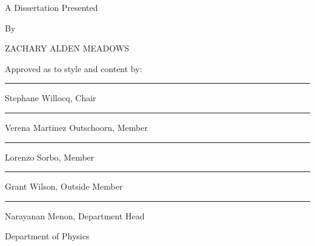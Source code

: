 \thispagestyle{empty}

\begin{center}
    \large
    \textbf{\expandafter{\ThesisTitle}} \par
    \vfill
    A Dissertation Presented \par
    By \par
    \uppercase\expandafter{Zachary Alden Meadows} \par
\end{center}

\vfill

\begin{flushleft}
    \normalsize
        Approved as to style and content by: \par
        \vskip 0.4in
        \rule{0.55\textwidth}{0.5pt} \par
        Stephane Willocq, Chair \par
        \vskip 0.25in
        \rule{0.55\textwidth}{0.5pt} \par
        Verena Martinez Outschoorn, Member \par
        \vskip 0.25in
        \rule{0.55\textwidth}{0.5pt} \par
        Lorenzo Sorbo, Member \par
        \vskip 0.25in
        \rule{0.55\textwidth}{0.5pt} \par
        Grant Wilson, Outside Member \par
\end{flushleft}

\newlength{\lenguide}
\settowidth{\lenguide}{\rule{0.55\textwidth}{0.5pt}}
\vskip 0.4in
    
\begin{flushright}
    \normalsize
    \rule{0.55\textwidth}{0.5pt} \par
    \parbox[t]{\lenguide}{Narayanan Menon, Department Head \par Department of Physics}
\end{flushright}